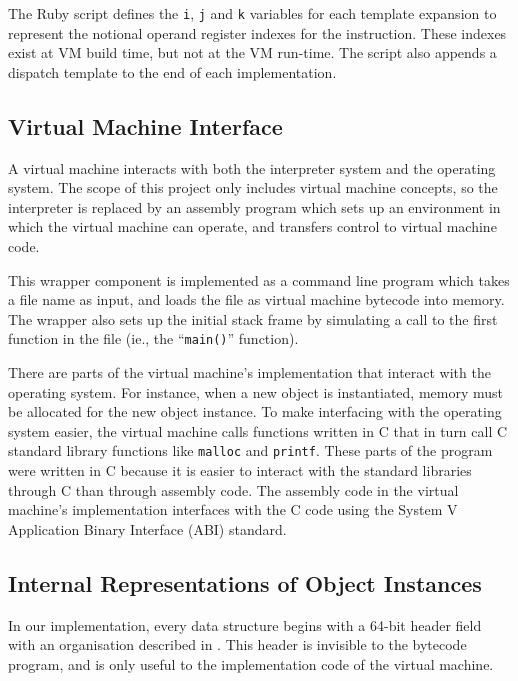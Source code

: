 		The Ruby script defines the \texttt{i}, \texttt{j} and \texttt{k} variables for each template expansion to represent the notional operand register indexes for the instruction. These indexes exist at VM build time, but not at the VM run-time. The script also appends a dispatch template to the end of each implementation.
		
		\subsection{Virtual Machine Interface}
		A virtual machine interacts with both the interpreter system and the operating system. The scope of this project only includes virtual machine concepts, so the interpreter is replaced by an assembly program which sets up an environment in which the virtual machine can operate, and transfers control to virtual machine code. 
		
		This wrapper component is implemented as a command line program which takes a file name as input, and loads the file as virtual machine bytecode into memory. The wrapper also sets up the initial stack frame by simulating a call to the first function in the file (ie., the ``\texttt{main()}'' function).
		
		There are parts of the virtual machine's implementation that interact with the operating system. For instance, when a new object is instantiated, memory must be allocated for the new object instance. To make interfacing with the operating system easier, the virtual machine calls functions written in C that in turn call C standard library functions like \texttt{malloc} and \texttt{printf}. These parts of the program were written in C because it is easier to interact with the standard libraries through C than through assembly code. The assembly code in the virtual machine's implementation interfaces with the C code using the System V Application Binary Interface (ABI) standard.
		
		\subsection{Internal Representations of Object Instances}
		In our implementation, every data structure begins with a 64-bit header field with an organisation described in . This header is invisible to the bytecode program, and is only useful to the implementation code of the virtual machine.
		
